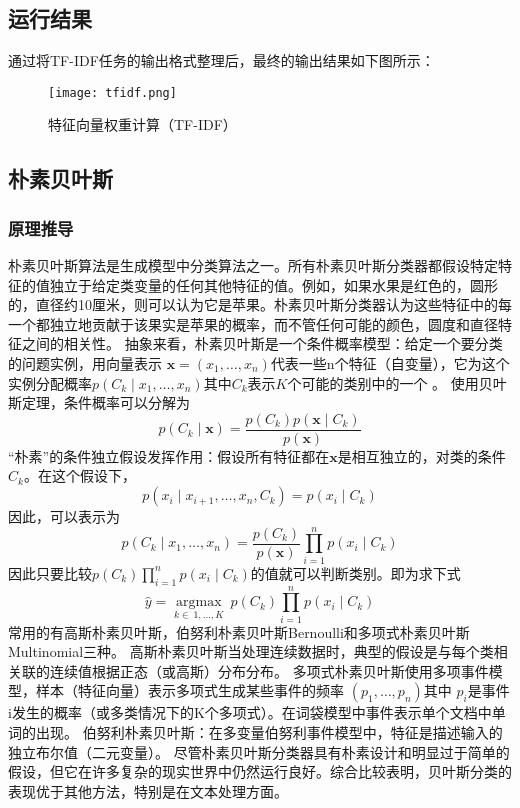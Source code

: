 \documentclass[lang=cn,11pt]{elegantpaper}
\begin{document}
\subsection{运行结果}
通过将TF-IDF任务的输出格式整理后，最终的输出结果如下图所示：
\begin{figure}[htbp]
	\centering
	\texttt{[image: tfidf.png]}
	\caption{特征向量权重计算（TF-IDF） \label{fig:tfidf}}
\end{figure}

\subsection{朴素贝叶斯}
\subsubsection{原理推导}
朴素贝叶斯算法是生成模型中分类算法之一。所有朴素贝叶斯分类器都假设特定特征的值独立于给定类变量的任何其他特征的值。例如，如果水果是红色的，圆形的，直径约10厘米，则可以认为它是苹果。朴素贝叶斯分类器认为这些特征中的每一个都独立地贡献于该果实是苹果的概率，而不管任何可能的颜色，圆度和直径特征之间的相关性。
抽象来看，朴素贝叶斯是一个条件概率模型：给定一个要分类的问题实例，用向量表示 $ \mathbf {x} =(x_ {1} , \dots, x_ {n})$代表一些n个特征（自变量），它为这个实例分配概率$p(C_ {k} \mid x_ {1}, \dots, x_ {n})$其中$C_{k}$表示$K$个可能的类别中的一个 。
使用贝叶斯定理，条件概率可以分解为
$$p(C_ {k} \mid \mathbf {x})= {\frac {p(C_ {k})p (\mathbf {x} \mid C_ {k})} {p(\mathbf {x} )}}$$
“朴素”的条件独立假设发挥作用：假设所有特征都在$\mathbf {x}$是相互独立的，对类的条件$ C_ {k}$。在这个假设下，
$$p(x_ {i}\mid x_ {i+1},\dots,x_ {n},C_ {k})= p(x_ {i} \mid C_ {k})$$
因此，可以表示为
$$p(C_ {k} \mid x_ {1},\dots,x_ {n})= \frac{p(C_ {k})}{p(\mathbf {x})}\prod_ {i = 1}^{n} p(x_ {i} \mid C_ {k})$$
因此只要比较$p(C_ {k})\prod_ {i = 1}^{n} p(x_ {i} \mid C_ {k})$的值就可以判断类别。即为求下式
$$\hat{y} = {\underset {k \in \ {1,\dots,K}} {\operatorname {argmax}}} \ p(C_ {k})\prod_{i = 1} ^ {n} p(x_ {i} \mid C_ {k})$$
常用的有高斯朴素贝叶斯，伯努利朴素贝叶斯Bernoulli和多项式朴素贝叶斯Multinomial三种。
高斯朴素贝叶斯当处理连续数据时，典型的假设是与每个类相关联的连续值根据正态（或高斯）分布分布。
多项式朴素贝叶斯使用多项事件模型，样本（特征向量）表示多项式生成某些事件的频率 $(p_ {1},\dots,p_ {n})$其中 $p_i$是事件i发生的概率（或多类情况下的K个多项式）。在词袋模型中事件表示单个文档中单词的出现。
伯努利朴素贝叶斯：在多变量伯努利事件模型中，特征是描述输入的独立布尔值（二元变量）。
尽管朴素贝叶斯分类器具有朴素设计和明显过于简单的假设，但它在许多复杂的现实世界中仍然运行良好。综合比较表明，贝叶斯分类的表现优于其他方法，特别是在文本处理方面。
\end{document}
